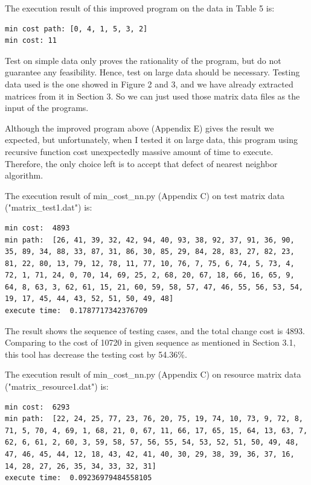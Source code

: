 \documentclass[12pt,a4paper]{article}
\begin{document}
The execution result of this improved program on the data in Table 5 is:

\begin{lstlisting}
min cost path: [0, 4, 1, 5, 3, 2]
min cost: 11
\end{lstlisting}

Test on simple data only proves the rationality of the program, but do not guarantee any feasibility. Hence, test on large data should be necessary. Testing data used is the one showed in Figure 2 and 3, and we have already extracted matrices from it in Section 3. So we can just used those matrix data files as the input of the programs.

Although the improved program above (Appendix E) gives the result we expected, but unfortunately, when I tested it on large data, this program using recursive function cost unexpectedly massive amount of time to execute. Therefore, the only choice left is to accept that defect of nearest neighbor algorithm.

The execution result of min\_cost\_nn.py (Appendix C) on test matrix data ("matrix\_test1.dat") is: 

\begin{lstlisting}
min cost:  4893
min path:  [26, 41, 39, 32, 42, 94, 40, 93, 38, 92, 37, 91, 36, 90, 35, 89, 34, 88, 33, 87, 31, 86, 30, 85, 29, 84, 28, 83, 27, 82, 23, 81, 22, 80, 13, 79, 12, 78, 11, 77, 10, 76, 7, 75, 6, 74, 5, 73, 4, 72, 1, 71, 24, 0, 70, 14, 69, 25, 2, 68, 20, 67, 18, 66, 16, 65, 9, 64, 8, 63, 3, 62, 61, 15, 21, 60, 59, 58, 57, 47, 46, 55, 56, 53, 54, 19, 17, 45, 44, 43, 52, 51, 50, 49, 48]
execute time:  0.1787717342376709
\end{lstlisting}

The result shows the sequence of testing cases, and the total change cost is 4893. Comparing to the cost of 10720 in given sequence as mentioned in Section 3.1, this tool has decrease the testing cost by 54.36\%. 

The execution result of min\_cost\_nn.py (Appendix C) on resource matrix data ("matrix\_resource1.dat") is: 

\begin{lstlisting}
min cost:  6293
min path:  [22, 24, 25, 77, 23, 76, 20, 75, 19, 74, 10, 73, 9, 72, 8, 71, 5, 70, 4, 69, 1, 68, 21, 0, 67, 11, 66, 17, 65, 15, 64, 13, 63, 7, 62, 6, 61, 2, 60, 3, 59, 58, 57, 56, 55, 54, 53, 52, 51, 50, 49, 48, 47, 46, 45, 44, 12, 18, 43, 42, 41, 40, 30, 29, 38, 39, 36, 37, 16, 14, 28, 27, 26, 35, 34, 33, 32, 31]
execute time:  0.09236979484558105
\end{lstlisting}
\end{document}
